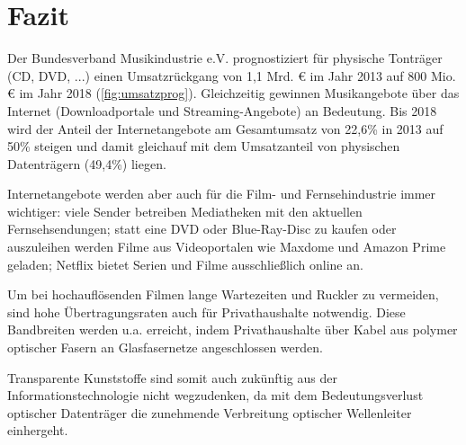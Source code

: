 \section{Fazit}
\label{sec:schluss}

Der Bundesverband Musikindustrie e.V. prognostiziert für physische Tonträger
(CD, DVD, ...) einen Umsatzrückgang von 1,1 Mrd. \euro{} im Jahr 2013 auf 800
Mio. \euro{} im Jahr 2018 (\autoref{fig:umsatzprog}). Gleichzeitig gewinnen
Musikangebote über das Internet (Downloadportale und Streaming-Angebote) an
Bedeutung. Bis 2018 wird der Anteil der Internetangebote am Gesamtumsatz von
22,6\% in 2013 auf 50\% steigen und damit gleichauf mit dem Umsatzanteil von
physischen Datenträgern (49,4\%) liegen.


Internetangebote werden aber auch für die Film- und Fernsehindustrie immer
wichtiger: viele Sender betreiben Mediatheken mit den aktuellen
Fernsehsendungen; statt eine DVD oder Blue-Ray-Disc zu kaufen oder auszuleihen
werden Filme aus Videoportalen wie Maxdome und Amazon Prime geladen; Netflix
bietet Serien und Filme ausschließlich online an.

Um bei hochauflösenden Filmen lange Wartezeiten und \glqq Ruckler\grqq{} zu
vermeiden, sind hohe Übertragungsraten auch für Privathaushalte notwendig. Diese
Bandbreiten werden u.a. erreicht, indem Privathaushalte über Kabel aus polymer
optischer Fasern an Glasfasernetze angeschlossen werden.

Transparente Kunststoffe sind somit auch zukünftig aus der
Informationstechnologie nicht wegzudenken, da mit dem Bedeutungsverlust
optischer Datenträger die zunehmende Verbreitung optischer Wellenleiter
einhergeht.

